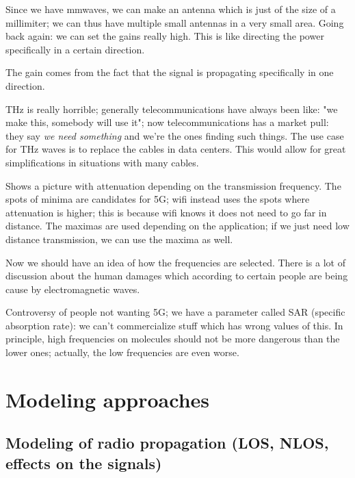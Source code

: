 \documentclass[a4paper, 12pt]{book}
\begin{document}
Since we have mmwaves, we can make an antenna which is just of the size of a millimiter; we can thus have multiple small antennas in a very small area.
Going back again: we can set the gains really high. This is like directing the power specifically in a certain direction.

\begin{greenbar}
The gain comes from the fact that the signal is propagating specifically in one direction.
\end{greenbar}

\begin{greybox}
THz is really horrible; generally telecommunications have always been like: "we make this, somebody will use it"; now telecommunications has a market pull: they say \textit{we need something} and we're the ones finding such things.
The use case for THz waves is to replace the cables in data centers. This would allow for great simplifications in situations with many cables.

\begin{greenbar}
Shows a picture with attenuation depending on the transmission frequency.
The spots of minima are candidates for 5G; wifi instead uses the spots where attenuation is higher; this is because wifi knows it does not need to go far in distance.
The maximas are used depending on the application; if we just need low distance transmission, we can use the maxima as well.
\end{greenbar}

Now we should have an idea of how the frequencies are selected. There is a lot of discussion about the human damages which according to certain people are being cause by electromagnetic waves.

\begin{greenbar}
Controversy of people not wanting 5G; we have a parameter called SAR (specific absorption rate): we can't commercialize stuff which has wrong values of this.
In principle, high frequencies on molecules should not be more dangerous than the lower ones; actually, the low frequencies are even worse.
\end{greenbar}
\end{greybox}

\section{Modeling approaches}

\subsection{Modeling of radio propagation (LOS, NLOS, effects on the signals)}
\end{document}
